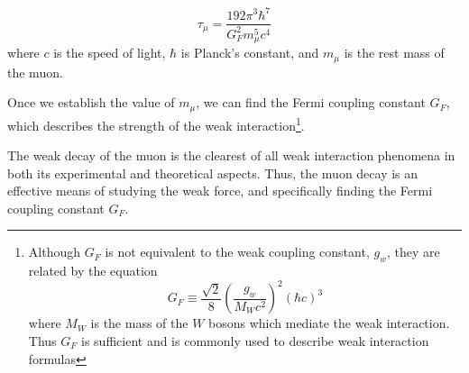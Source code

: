 \begin{equation}\tau_{\mu} = \dfrac{192\pi^3\hbar^7}{G_F^2m_{\mu}^5c^4}\end{equation}
where $c$ is the speed of light, $\hbar$ is Planck's constant, and
$m_{\mu}$ is the rest mass of the muon. 

Once we establish the value of $m_{\mu}$, we can find the Fermi
coupling constant $G_F$, which describes the strength of the weak
interaction\footnote{Although $G_F$ is not equivalent to the weak
coupling constant, $g_w$, they are related by the equation
\[G_F\equiv \frac{\sqrt{2}}{8}\left(\frac{g_w}{M_Wc^2}\right)^2(\hbar c)^3\]
where $M_W$ is the mass of the $W$ bosons which mediate the weak
interaction. Thus $G_F$ is sufficient and is commonly used to describe
weak interaction formulas\cite[p.~313]{griffiths}}.

The weak decay of the muon is the clearest of all weak interaction
phenomena in both its experimental and theoretical aspects. Thus, the
muon decay is an effective means of studying the weak force, and
specifically finding the Fermi coupling constant $G_F$.
